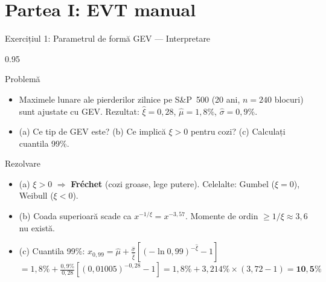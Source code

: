\documentclass[9pt, aspectratio=169, t]{beamer}
\begin{document}
\section{Partea I: EVT manual}

\begin{frame}{Exercițiul 1: Parametrul de formă GEV --- Interpretare}
    \begin{cminipage}{0.95\textwidth}
\begin{block}{Problemă}
\begin{itemize}\setlength{\itemsep}{0pt}
    \item Maximele lunare ale pierderilor zilnice pe S\&P~500 (20 ani, $n=240$ blocuri) sunt ajustate cu GEV. Rezultat: $\hat{\xi} = 0{,}28$, $\hat{\mu} = 1{,}8\%$, $\hat{\sigma} = 0{,}9\%$.
    \item (a) Ce tip de GEV este? (b) Ce implică $\xi > 0$ pentru cozi? (c) Calculați cuantila 99\%.
\end{itemize}
\end{block}

\begin{exampleblock}{Rezolvare}
\begin{itemize}\setlength{\itemsep}{0pt}
    \item (a) $\xi > 0$ $\Rightarrow$ \textbf{Fréchet} (cozi groase, lege putere). Celelalte: Gumbel ($\xi = 0$), Weibull ($\xi < 0$).
    \item (b) Coada superioară scade ca $x^{-1/\xi} = x^{-3{,}57}$. Momente de ordin $\geq 1/\xi \approx 3{,}6$ nu există.
    \item (c) Cuantila 99\%: $x_{0{,}99} = \hat{\mu} + \frac{\hat{\sigma}}{\hat{\xi}}\left[(-\ln 0{,}99)^{-\hat{\xi}} - 1\right]$
    $= 1{,}8\% + \frac{0{,}9\%}{0{,}28}\left[(0{,}01005)^{-0{,}28} - 1\right] = 1{,}8\% + 3{,}214\% \times (3{,}72 - 1) = \mathbf{10{,}5\%}$
\end{itemize}
\end{exampleblock}
    \end{cminipage}
\end{frame}
\end{document}
